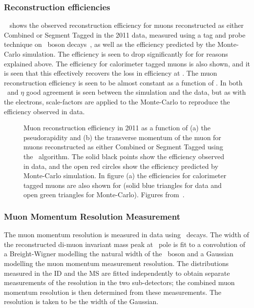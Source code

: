 \subsubsection{Reconstruction efficiencies}

~ shows the observed reconstruction efficiency for muons
reconstructed as either Combined or Segment
Tagged in the 2011 data, measured using
a tag and probe technique on \Z\ boson decays~\cite{ATLAS-CONF-2011-063}, as well as the efficiency predicted by the
Monte-Carlo simulation. The efficiency is
seen to drop significantly for  for reasons explained above. The
efficiency for calorimeter tagged muons is also shown, and it is seen that this
effectively recovers the loss in efficiency at . The muon
reconstruction efficiency is seen to be almost constant as a function of \pt. In
both \pt\ and $\eta$ good agreement is seen between the simulation and the data,
but as with the electrons, scale-factors are applied to the Monte-Carlo to
reproduce the efficiency observed in data.

\begin{figure}[h]
\centering
\caption{Muon reconstruction efficiency in 2011 as a function of (a) the pseudorapidity
and (b) the transverse momentum of the muon for muons reconstructed as either Combined or Segment
Tagged using the \staco\ algorithm. The solid black points
show the efficiency observed in data, and the open red circles show the
efficiency predicted by Monte-Carlo simulation. In figure (a) the efficiencies for
calorimeter tagged muons are also shown for  (solid blue triangles
for data and open green triangles for Monte-Carlo). Figures from~\cite{MuonEfficiency2011}.}
\label{fig:mu-reco-eff}
\end{figure}


\subsubsection{Muon Momentum Resolution Measurement}

The muon momentum resolution is measured in data using \Zmm\ decays. The width
of the reconstructed di-muon invariant mass peak at \Z\ pole is fit to a
convolution of a Breight-Wigner modelling the natural width of the \Z\ boson and
a Gaussian modelling the muon momentum measurement resolution. The
distributions measured in the ID and the MS are fitted independently to obtain
separate measurements of the resolution in the two sub-detectors; the combined
muon momentum resolution is then determined from these measurements. The
resolution is taken to be the width of the Gaussian.

